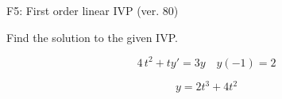 \begin{exercise}
  \begin{exerciseTitle}F5: First order linear IVP (ver. 80)\end{exerciseTitle}
  \begin{exerciseStatement}
    
Find the solution to the given IVP.

    
\[4 \, t^{2} +ty'= 3 y \hspace{1em} y( -1 ) = 2\]

  \end{exerciseStatement}
  \begin{exerciseAnswer}
    
\[y= 2 t^ 3 +4 t^{2}\]

  \end{exerciseAnswer}
\end{exercise}